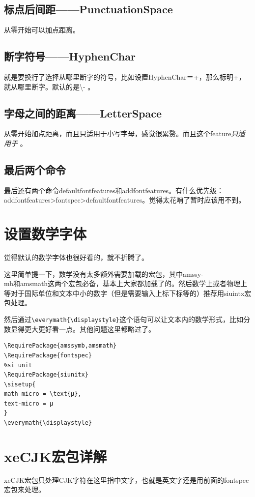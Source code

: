 \documentclass[11pt,oneside]{book}
\begin{document}
\subsection{标点后间距——PunctuationSpace}
从零开始可以加点距离。

\subsection{断字符号——HyphenChar}
就是要换行了选择从哪里断字的符号，比如设置HyphenChar＝{+}，那么标明+，就从哪里断字。默认的是\textbackslash{}- 。

\subsection{字母之间的距离——LetterSpace}
从零开始加点距离，而且只适用于小写字母，感觉很累赘。而且这个feature\emph{只适用于\XeTeX} 。


\subsection{最后两个命令}
最后还有两个命令defaultfontfeatures和addfontfeatures。有什么优先级：\\ addfontfeatures>fontspec>defaultfontfeatures。觉得太花哨了暂时应该用不到。




\section{设置数学字体}
觉得默认的数学字体也很好看的，就不折腾了。

这里简单提一下，数学没有太多额外需要加载的宏包，其中amssy-\\mb和amsmath这两个宏包必备，基本上大家都加载了的。然后数学上或者物理上等对于国际单位和文本中小的数字（但是需要输入上标下标等的）推荐用siuintx宏包处理。

然后通过\verb+\everymath{\displaystyle}+这个语句可以让文本内的数学形式，比如分数显得更大更好看一点。其他问题这里都略过了。

\begin{Verbatim}
\RequirePackage{amssymb,amsmath}
\RequirePackage{fontspec}
%si unit
\RequirePackage{siunitx}
\sisetup{
math-micro = \text{μ},
text-micro = μ
}
\everymath{\displaystyle}
\end{Verbatim}



\section{xeCJK宏包详解}
xeCJK宏包只处理CJK字符在这里指中文字，也就是英文字还是用前面的fontspec宏包来处理。
\end{document}
